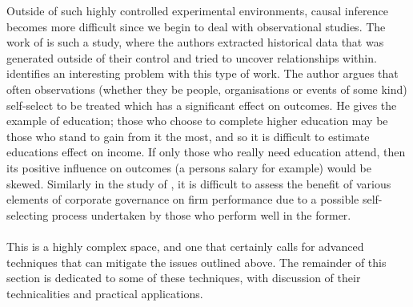 {{Outside of such highly controlled experimental environments, causal inference becomes more difficult since we begin to deal with observational studies. The work of \cite{moldovan2015learning} is such a study, where the authors extracted historical data that was generated outside of their control and tried to uncover relationships within. \cite{esarey2015causal} identifies an interesting problem with this type of work. The author argues that often observations (whether they be people, organisations or events of some kind) self-select to be treated which has a significant effect on outcomes. He gives the example of education; those who choose to complete higher education may be those who stand to gain from it the most, and so it is difficult to estimate educations effect on income. If only those who really need education attend, then its positive influence on outcomes (a persons salary for example) would be skewed. Similarly in the study of \cite{moldovan2015learning}, it is difficult to assess the benefit of various elements of corporate governance on firm performance due to a possible self-selecting process undertaken by those who perform well in the former. \\\\
This is a highly complex space, and one that certainly calls for advanced techniques that can mitigate the issues outlined above. The remainder of this section is dedicated to some of these techniques, with discussion of their technicalities and practical applications.  }
}
